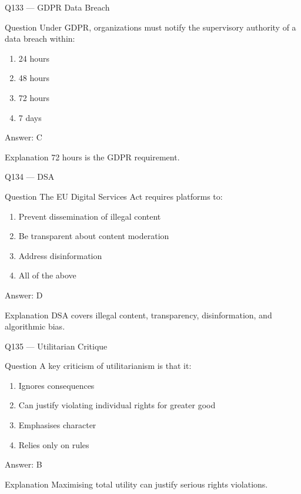 \documentclass[aspectratio=169,8pt]{beamer}
\begin{document}
	\begin{frame}{Q133 --- GDPR Data Breach}
		\begin{block}{Question}
			Under GDPR, organizations must notify the supervisory authority of a data breach within:
		\end{block}
		\begin{enumerate}
			\item 24 hours
			\item 48 hours
			\item 72 hours
			\item 7 days
		\end{enumerate}
		\begin{exampleblock}{Answer: C}\end{exampleblock}
		\begin{block}{Explanation}
			72 hours is the GDPR requirement.
		\end{block}
	\end{frame}
	
	\begin{frame}{Q134 --- DSA}
		\begin{block}{Question}
			The EU Digital Services Act requires platforms to:
		\end{block}
		\begin{enumerate}
			\item Prevent dissemination of illegal content
			\item Be transparent about content moderation
			\item Address disinformation
			\item All of the above
		\end{enumerate}
		\begin{exampleblock}{Answer: D}\end{exampleblock}
		\begin{block}{Explanation}
			DSA covers illegal content, transparency, disinformation, and algorithmic bias.
		\end{block}
	\end{frame}
	
	\begin{frame}{Q135 --- Utilitarian Critique}
		\begin{block}{Question}
			A key criticism of utilitarianism is that it:
		\end{block}
		\begin{enumerate}
			\item Ignores consequences
			\item Can justify violating individual rights for greater good
			\item Emphasises character
			\item Relies only on rules
		\end{enumerate}
		\begin{exampleblock}{Answer: B}\end{exampleblock}
		\begin{block}{Explanation}
			Maximising total utility can justify serious rights violations.
		\end{block}
	\end{frame}
	
\end{document}
